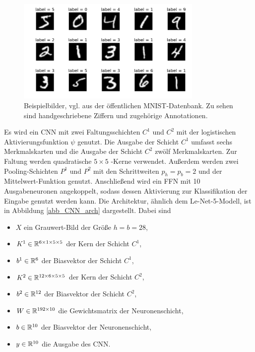 \begin{figure}[h]
    \includegraphics[width=0.8\textwidth]{pics/chapters/CCN/mnist.png}
    \centering
    \caption{Beispielbilder, vgl. \cite{DBLP:journals/pieee/LeCunBBH98} aus der öffentlichen MNIST-Datenbank. Zu sehen sind handgeschriebene Ziffern und zugehörige Annotationen.}
    \label{mnistpic}
\end{figure}

Es wird ein CNN mit zwei Faltungsschichten $C^1$ und $C^2$ mit der logistischen Aktivierungsfunktion $\psi$ genutzt. Die Ausgabe der Schicht $C^1$ umfasst sechs Merkmalskarten und die Ausgabe der Schicht $C^2$ zwölf Merkmalskarten. Zur Faltung werden quadratische $5 \times 5$ -Kerne verwendet. Außerdem werden zwei Pooling-Schichten $P^1$ und $P^2$ mit den Schrittweiten $p_h=p_b=2$ und der Mittelwert-Funktion genutzt. Anschließend wird ein FFN mit 10 Ausgabeneuronen angekoppelt, sodass dessen Aktivierung zur Klassifikation der Eingabe genutzt werden kann. Die Architektur, ähnlich dem Le-Net-5-Modell\cite{DBLP:journals/pieee/LeCunBBH98}, ist in Abbildung \ref{abb_CNN_arch} dargestellt. Dabei sind

\begin{itemize}
    \item $X$ ein Grauwert-Bild der Größe $h=b=28$,
    \item $K^1 \in \mathbb{R}^{6 \times 1 \times 5 \times 5}$ der Kern der Schicht $C^1$,
    \item $b^1 \in \mathbb{R}^6$ der Biasvektor der Schicht $C^1$,
    \item $K^2 \in \mathbb{R}^{12 \times 6 \times 5 \times 5}$ der Kern der Schicht $C^2$,
    \item $b^2 \in \mathbb{R}^{12}$ der Biasvektor der Schicht $C^2$,
    \item $W \in \mathbb{R}^{192 \times 10}$ die Gewichtsmatrix der Neuronenschicht,
    \item $b \in \mathbb{R}^{10}$ der Biasvektor der Neuronenschicht,
    \item $y \in \mathbb{R}^{10}$ die Ausgabe des CNN. 
\end{itemize}


